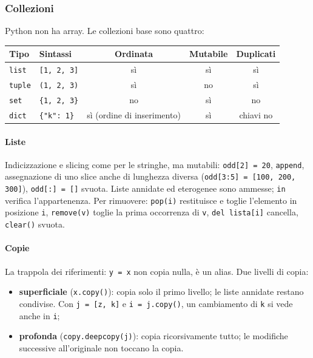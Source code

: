 \documentclass[a4paper,12pt]{article}
\begin{document}
\subsubsection{Collezioni}
Python non ha array. Le collezioni base sono quattro:
\begin{center}
\begin{tabular}{|l|l|c|c|c|}
\hline
Tipo & Sintassi & Ordinata & Mutabile & Duplicati \\
\hline
\texttt{list} & \texttt{[1, 2, 3]} & sì & sì & sì \\
\texttt{tuple} & \texttt{(1, 2, 3)} & sì & no & sì \\
\texttt{set} & \texttt{\{1, 2, 3\}} & no & sì & no \\
\texttt{dict} & \texttt{\{"k": 1\}} & sì (ordine di inserimento) & sì & chiavi no \\
\hline
\end{tabular}
\end{center}

\paragraph{Liste} Indicizzazione e slicing come per le stringhe, ma mutabili:
\texttt{odd[2] = 20}, \texttt{append}, assegnazione di uno slice anche di lunghezza
diversa (\texttt{odd[3:5] = [100, 200, 300]}), \texttt{odd[:] = []} svuota. Liste annidate
ed eterogenee sono ammesse; \texttt{in} verifica l'appartenenza. Per rimuovere:
\texttt{pop(i)} restituisce e toglie l'elemento in posizione \texttt{i}, \texttt{remove(v)}
toglie la prima occorrenza di \texttt{v}, \texttt{del lista[i]} cancella, \texttt{clear()}
svuota.

\paragraph{Copie} La trappola dei riferimenti: \texttt{y = x} non copia nulla, è un
alias. Due livelli di copia:
\begin{itemize}[nosep]
  \item \textbf{superficiale} (\texttt{x.copy()}): copia solo il primo livello; le liste
        annidate restano condivise. Con \texttt{j = [z, k]} e \texttt{i = j.copy()}, un
        cambiamento di \texttt{k} si vede anche in \texttt{i};
  \item \textbf{profonda} (\texttt{copy.deepcopy(j)}): copia ricorsivamente tutto; le
        modifiche successive all'originale non toccano la copia.
\end{itemize}
\end{document}
